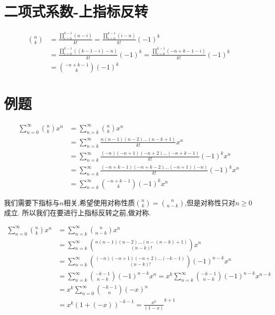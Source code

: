 \documentclass{article}
\begin{document}
\section*{二项式系数-上指标反转}
\[
	\begin{aligned}
		\binom{n}{k}
		 & =\frac{\prod_{i=0}^{k-1} (n-i)}{k!}=\frac{\prod_{i=0}^{k-1} (i-n)}{k!}{(-1)}^k                    \\
		 & =\frac{\prod_{i=0}^{k-1} ((k-1-i)-n)}{k!}{(-1)}^k=\frac{\prod_{i=0}^{k-1} (-n+k-1-i)}{k!}{(-1)}^k \\
		 & =\binom{-n+k-1}{k}{(-1)}^k
	\end{aligned}
\]

\section*{例题}

\[
	\begin{aligned}
		\sum_{n=0}^\infty \binom{n}{k}x^n
		 & =\sum_{n=k}^\infty \binom{n}{k}x^n                                          \\
		 & =\sum_{n=k}^\infty \frac{n(n-1)(n-2)\ldots (n-k+1)}{k!}x^n                  \\
		 & =\sum_{n=k}^\infty \frac{(-n)(-n+1)(-n+2)\ldots (-n+k-1)}{k!}{(-1)}^k x^n   \\
		 & =\sum_{n=k}^\infty \frac{(-n+k-1)(-n+k-2)\ldots (-n+1)(-n)}{k!}{(-1)}^k x^n \\
		 & =\sum_{n=k}^\infty \binom{-n+k-1}{k}{(-1)}^k x^n
	\end{aligned}
\]

我们需要下指标与$n$相关,希望使用对称性质$\binom{n}{k}=\binom{n}{n-k}$,但是对称性只对$n\geq 0$成立. 所以我们在要进行上指标反转之前,做对称.

\[
	\begin{aligned}
		\sum_{n=0}^\infty \binom{n}{k}x^n
		 & =\sum_{n=k}^\infty \binom{n}{n-k}x^n                                                                             \\
		 & =\sum_{n=k}^\infty \binom{n(n-1)(n-2)\ldots (n-(n-k)+1)}{(n-k)!} x^n                                             \\
		 & =\sum_{n=k}^\infty \binom{(-n)(-n+1)(-n+2)\ldots (-k-1)}{(n-k)!} {(-1)}^{n-k}x^n                                 \\
		 & =\sum_{n=k}^\infty \binom{-k-1}{n-k}{(-1)}^{n-k} x^n=x^k \sum_{n=k}^\infty \binom{-k-1}{n-k}{(-1)}^{n-k} x^{n-k} \\
		 & =x^k \sum_{n=0}^\infty \binom{-k-1}{n}{(-x)}^n                                                                   \\
		 & =x^k {(1+(-x))}^{-k-1}=\frac{x^k}{(1-x)}^{k+1}
	\end{aligned}
\]
\end{document}
